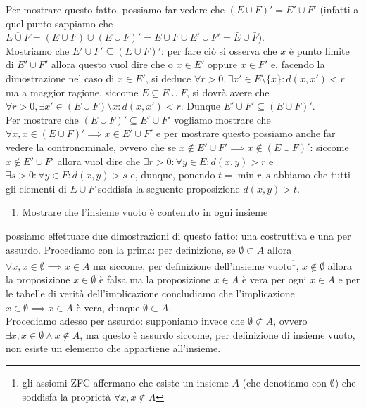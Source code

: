 \documentclass{report}
\begin{document}
\begin{myproof}
Per mostrare questo fatto, possiamo far vedere che $(E \cup F)' = E' \cup F'$ (infatti a quel punto sappiamo che $\overline{E \cup F} = (E \cup F) \cup (E \cup F)' = E \cup F \cup E' \cup F' = \bar{E} \cup \bar{F}$). \\
Mostriamo che $E' \cup F' \subseteq (E \cup F)'$: per fare ciò si osserva che $x$ è punto limite di $E' \cup F'$ allora questo vuol dire che o $x \in E'$ oppure $x \in F'$ e, facendo la dimostrazione nel caso di $x \in E'$, si deduce $\forall r > 0, \exists x' \in E \setminus \{x \} : d(x, x') < r$ ma a maggior ragione, siccome $E \subseteq E \cup F$, si dovrà avere che $\forall r > 0, \exists x' \in (E \cup F) \setminus x: d(x, x') < r$. Dunque $E' \cup F' \subseteq (E \cup F)'$. \\
Per mostrare che $(E \cup F)' \subseteq E' \cup F'$ vogliamo mostrare che $\forall x, x \in (E \cup F)' \implies x \in E' \cup F'$ e per mostrare questo possiamo anche far vedere la contronominale, ovvero che se $x \not\in E' \cup F' \implies x \not\in (E \cup F)'$: siccome $x \not\in E' \cup F'$ allora vuol dire che $\exists r>0: \forall y \in E: d(x, y) > r$ e $\exists  s >0: \forall y \in F: d(x, y) > s$ e, dunque, ponendo $t = \min{r,s }$ abbiamo che tutti gli elementi di $E \cup F$ soddisfa la seguente proposizione $d(x, y) > t$.
\end{myproof}
\begin{enumerate}[label=\protect\circled{\arabic*}]
	\item Mostrare che l'insieme vuoto è contenuto in ogni insieme
\end{enumerate}
\begin{mysolution}
	possiamo effettuare due dimostrazioni di questo fatto: una costruttiva e una per assurdo. Procediamo con la prima: per definizione, se $\emptyset \subset A$ allora $\forall x, x \in \emptyset \implies x \in A$ ma siccome, per definizione dell'insieme vuoto\footnote{gli assiomi ZFC affermano che esiste un insieme $A$ (che denotiamo con $\emptyset$) che soddisfa la proprietà $\forall x, x \not\in A$}, $x \not\in \emptyset$ allora la proposizione $x \in \emptyset$ è falsa ma la proposizione $x \in A$ è vera per ogni $x \in A$ e per le tabelle di verità dell'implicazione concludiamo che l'implicazione $x \in \emptyset \implies x \in A$ è vera, dunque $\emptyset \subset A$. \\
	Procediamo adesso per assurdo: supponiamo invece che $\emptyset \not\subset A$, ovvero $\exists x, x \in \emptyset \wedge x \not\in A$, ma questo è assurdo siccome, per definizione di insieme vuoto, non esiste un elemento che appartiene all'insieme.
\end{mysolution}
\end{document}
